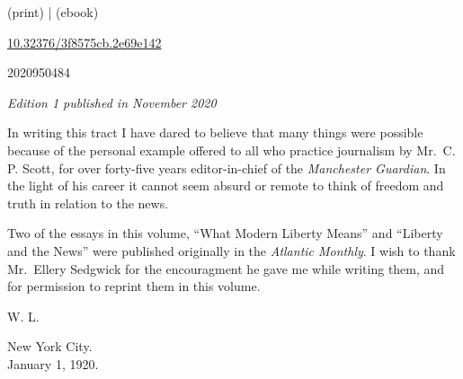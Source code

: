 \documentclass[openany,nobib,nohyper]{tufte-book}
\begin{document}
\begin{fullwidth}
\par {} (print) |  (ebook)

\par {} \href{https://doi.org/10.32376/3f8575cb.2e69e142}{10.32376/3f8575cb.2e69e142}

\par {} 2020950484

\par\textit{Edition 1 published in November 2020}






\newpage
\thispagestyle{empty}
\begingroup
\vspace*{.15in}

\setlength{\parindent}{5ex}
\huge{In writing this tract I have dared to believe that many things were
possible because of the personal example offered to all who practice
journalism by Mr.~C. P. Scott, for over forty-five years editor-in-chief
of the \emph{Manchester Guardian}. In the light of his career it cannot
seem absurd or remote to think of freedom and truth in relation to the
news.}

\huge{Two of the essays in this volume, ``What Modern Liberty Means'' and
``Liberty and the News'' were published originally in the \emph{Atlantic
Monthly}. I wish to thank Mr.~Ellery Sedgwick for the encouragment he
gave me while writing them, and for permission to reprint them in this
volume.}

\begin{flushright}W. L.\end{flushright}

\vspace*{2mm}

\noindent New York City.\\
January 1, 1920.

\endgroup
\begingroup

\newpage
\thispagestyle{plain} %
\mbox{}


\LARGE

\tableofcontents

\endgroup

\end{fullwidth}

\newpage
\thispagestyle{plain} %
\mbox{}

\end{document}
